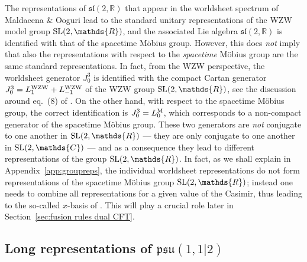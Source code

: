 \documentclass[12pt,a4paper]{article}
\begin{document}
The representations of $\mathfrak{sl}(2,\mathds{R})$ that appear in the worldsheet spectrum of Maldacena \& Ooguri \cite{Maldacena:2000hw} lead to the standard unitary representations of the WZW model group ${\rm SL}(2,\mathds{R})$, and the associated Lie algebra $\mathfrak{sl}(2,\mathds{R})$ is identified with that of the spacetime M\"obius group. However, this does {\it not} imply that also the representations with respect to the 
{\it spacetime} M\"obius group are the same standard representations. In fact, from the WZW perspective, the worldsheet generator $J^3_0$ is identified with the compact Cartan generator $J^3_0 = L^{\rm WZW}_1 + L^{\rm WZW}_{-1}$ of the WZW group ${\rm SL}(2,\mathds{R})$, see the discussion around eq.~(8) of \cite{Maldacena:2000hw}. 
On the other hand, with respect to the spacetime M\"obius group, the correct identification is $J^3_0 = L^{\rm M}_0$, which corresponds to a non-compact generator of the spacetime M\"obius group. 
These two generators are {\it not} conjugate to one another in ${\rm SL}(2,\mathds{R})$ --- they are only conjugate to one another in ${\rm SL}(2,\mathds{C})$ --- and as a consequence they lead to different representations of the group ${\rm SL}(2,\mathds{R})$. In fact, as we shall explain in Appendix~\ref{app:groupreps}, the individual worldsheet representations do not form representations of the spacetime M\"obius group ${\rm SL}(2,\mathds{R})$; instead one needs to combine all representations for a given value of the Casimir, thus leading to the so-called $x$-basis of \cite{Maldacena:2000hw}. This will play a crucial role later in Section~\ref{sec:fusion rules dual CFT}.




\subsection{Long representations of $\mathfrak{psu}(1,1|2)$} \label{subsec:long representations psu112}
\end{document}
